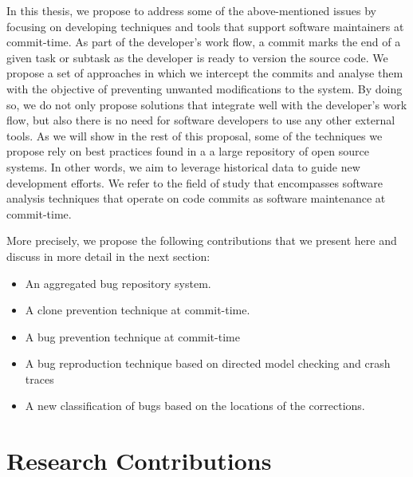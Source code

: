 In this thesis, we propose to address some of the above-mentioned issues by focusing on developing techniques and tools that support software maintainers at commit-time. As part of the developer's work flow, a commit marks the end of a given task or subtask  as the developer is ready to version the source code. We propose a set of approaches in which we intercept the commits and analyse them with the objective of preventing unwanted modifications to the system. By doing so, we do not only propose solutions that integrate well with the developer's work flow, but also there is no need for software developers to use any other external tools. As we will show in the rest of this proposal, some of the techniques we propose rely on best practices found in a a large repository of open source systems. In other words, we aim to leverage historical data to guide new development efforts. We refer to the field of study that encompasses software analysis techniques that operate on code commits as software maintenance at commit-time. 

More precisely, we propose the following contributions that we present here and discuss in more detail in the next section:
\begin{itemize}
	\item An aggregated bug repository system.
	\item A clone prevention technique at commit-time.
	\item A bug prevention technique at commit-time
	\item A bug reproduction technique based on directed model checking and crash traces
	\item A new classification of bugs based on the locations of the corrections.
\end{itemize}


\section{Research Contributions\label{sec:objective-thesis}}

